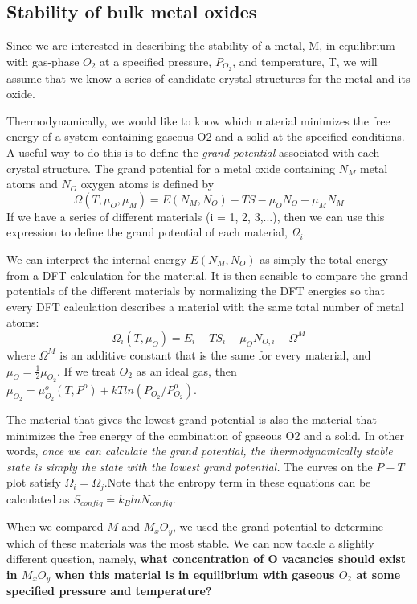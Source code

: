 \documentclass[12pt]{article}
\begin{document}
\subsection{Stability of bulk metal oxides}
Since we are interested in describing the stability of a metal, M, in equilibrium with gas-phase $O_2$ at a specified pressure, $P_{O_2}$, and temperature, T, we will assume that we know a series of candidate crystal structures for the metal and its oxide.

Thermodynamically, we would like to know which material minimizes the free energy of a system containing gaseous O2 and a solid at the specified conditions. A useful way to do this is to define the \emph{grand potential} associated with each crystal structure. The grand potential for a metal oxide containing $N_M$ metal atoms and $N_O$ oxygen atoms is defined by
\begin{equation}
    \Omega(T, \mu_O, \mu_M)=E(N_M, N_O)-TS-\mu_ON_O-\mu_MN_M
\end{equation}
If we have a series of different materials (i = 1, 2, 3,...), then we can use this expression to define the grand potential of each material, $\Omega_i$.

We can interpret the internal energy $E(N_M, N_O)$ as simply the total energy from a DFT calculation for the material. It is then sensible to compare the grand potentials of the different materials by normalizing the DFT energies so that every DFT calculation describes a material with the same total number of metal atoms:
\begin{equation}
    \Omega_i(T, \mu_O)=E_i-TS_i-\mu_ON_{O,i}-\Omega^M
\end{equation}
where $\Omega^M$ is an additive constant that is the same for every material, and $\mu_{O} = \frac{1}{2}\mu_{O_2}$. If we treat $O_2$ as an ideal gas, then $\mu_{O_2} = \mu^o_{O_2}(T,P^o)+kTln(P_{O_2}/P^o_{O_2})$.

The material that gives the lowest grand potential is also the material that minimizes the free energy of the combination of gaseous O2 and a solid. In other words, \emph{once we can calculate the grand potential, the thermodynamically stable state is simply the state with the lowest grand potential.} The curves on the $P-T$ plot satisfy $\Omega_i=\Omega_j$.Note that the entropy term in these equations can be calculated as $S_{config}=k_BlnN_{config}$.

When we compared $M$ and $M_xO_y$, we used the grand potential to determine which of these materials was the most stable. We can now tackle a slightly different question, namely, \textbf{what concentration of O vacancies should exist in $M_xO_y$ when this material is in equilibrium with gaseous $O_2$ at some specified pressure and temperature?}
\end{document}
